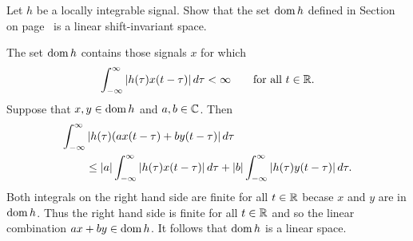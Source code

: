 \begin{excersizelist}
\begin{solution}
\begin{center}
 \;\;
\end{center}

\end{solution}

\item \label{exer:finhlinshiftinv}  Let $h$ be a locally integrable signal.  Show that the set $\operatorname{dom} h$ defined in Section~ on page~ is a linear shift-invariant space.
\begin{solution}
The set $\operatorname{dom} h$ contains those signals $x$ for which
\[
\int_{-\infty}^\infty \left\vert h(\tau)x(t - \tau) \right\vert d\tau < \infty \qquad \text{for all $t \in {\mathbb R}$.}
\]
Suppose that $x, y \in \operatorname{dom} h$ and $a, b \in {\mathbb C}$.  Then
\begin{align*}
\int_{-\infty}^\infty &\left\vert h(\tau)(ax(t - \tau) + by(t - \tau) \right\vert d\tau \\
&\leq \left\vert a \right\vert \int_{-\infty}^\infty \left\vert h(\tau) x(t - \tau) \right\vert d\tau + \left\vert b \right\vert \int_{-\infty}^\infty \left\vert h(\tau) y(t - \tau) \right\vert d\tau.
\end{align*}
Both integrals on the right hand side are finite for all $t \in {\mathbb R}$ becase $x$ and $y$ are in $\operatorname{dom} h$.  Thus the right hand side is finite for all $t\in{\mathbb R}$ and so the linear combination $ax + by \in \operatorname{dom} h$.  It follows that $\operatorname{dom} h$ is a linear space.


\end{solution}
\end{excersizelist}

